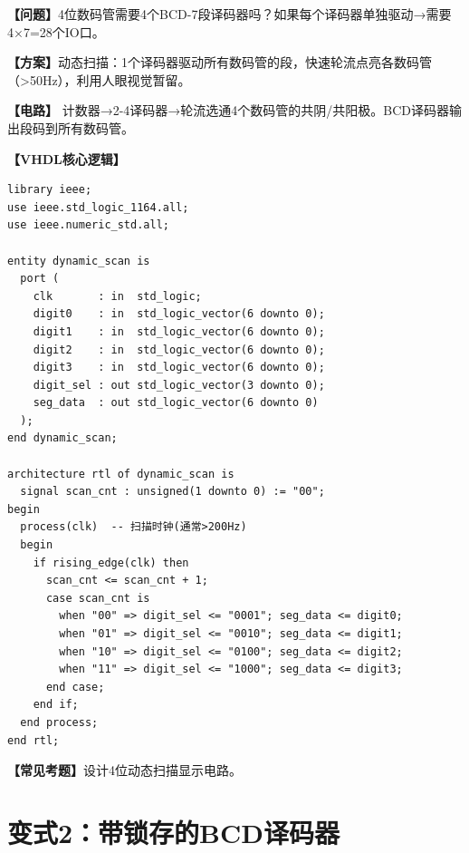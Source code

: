 \begin{detailbox}[完整教学]
\textbf{【问题】}4位数码管需要4个BCD-7段译码器吗？如果每个译码器单独驱动→需要4×7=28个IO口。

\textbf{【方案】}动态扫描：1个译码器驱动所有数码管的段，快速轮流点亮各数码管（>50Hz），利用人眼视觉暂留。

\textbf{【电路】}
计数器→2-4译码器→轮流选通4个数码管的共阴/共阳极。BCD译码器输出段码到所有数码管。

\textbf{【VHDL核心逻辑】}
\begin{lstlisting}
library ieee;
use ieee.std_logic_1164.all;
use ieee.numeric_std.all;

entity dynamic_scan is
  port (
    clk       : in  std_logic;
    digit0    : in  std_logic_vector(6 downto 0);
    digit1    : in  std_logic_vector(6 downto 0);
    digit2    : in  std_logic_vector(6 downto 0);
    digit3    : in  std_logic_vector(6 downto 0);
    digit_sel : out std_logic_vector(3 downto 0);
    seg_data  : out std_logic_vector(6 downto 0)
  );
end dynamic_scan;

architecture rtl of dynamic_scan is
  signal scan_cnt : unsigned(1 downto 0) := "00";
begin
  process(clk)  -- 扫描时钟(通常>200Hz)
  begin
    if rising_edge(clk) then
      scan_cnt <= scan_cnt + 1;
      case scan_cnt is
        when "00" => digit_sel <= "0001"; seg_data <= digit0;
        when "01" => digit_sel <= "0010"; seg_data <= digit1;
        when "10" => digit_sel <= "0100"; seg_data <= digit2;
        when "11" => digit_sel <= "1000"; seg_data <= digit3;
      end case;
    end if;
  end process;
end rtl;
\end{lstlisting}

\textbf{【常见考题】}设计4位动态扫描显示电路。
\end{detailbox}


\section{变式2：带锁存的BCD译码器}

